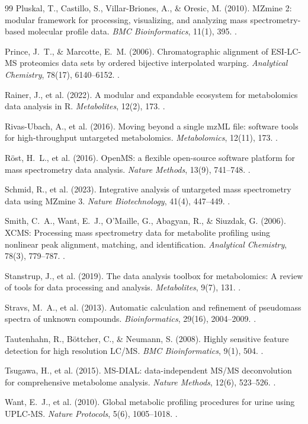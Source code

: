 \documentclass[11pt,twoside,openright]{book}
\begin{document}
\begin{thebibliography}{99}
Pluskal, T., Castillo, S., Villar-Briones, A., \& Oresic, M. (2010). MZmine 2: modular framework for processing, visualizing, and analyzing mass spectrometry-based molecular profile data. \textit{BMC Bioinformatics}, 11(1), 395. .

Prince, J.~T., \& Marcotte, E.~M. (2006). Chromatographic alignment of ESI-LC-MS proteomics data sets by ordered bijective interpolated warping. \textit{Analytical Chemistry}, 78(17), 6140--6152. .

Rainer, J., et al. (2022). A modular and expandable ecosystem for metabolomics data analysis in R. \textit{Metabolites}, 12(2), 173. .

Rivas-Ubach, A., et al. (2016). Moving beyond a single mzML file: software tools for high-throughput untargeted metabolomics. \textit{Metabolomics}, 12(11), 173. .

R\"ost, H.~L., et al. (2016). OpenMS: a flexible open-source software platform for mass spectrometry data analysis. \textit{Nature Methods}, 13(9), 741--748. .

Schmid, R., et al. (2023). Integrative analysis of untargeted mass spectrometry data using MZmine 3. \textit{Nature Biotechnology}, 41(4), 447--449. .

Smith, C.~A., Want, E.~J., O'Maille, G., Abagyan, R., \& Siuzdak, G. (2006). XCMS: Processing mass spectrometry data for metabolite profiling using nonlinear peak alignment, matching, and identification. \textit{Analytical Chemistry}, 78(3), 779--787. .

Stanstrup, J., et al. (2019). The data analysis toolbox for metabolomics: A review of tools for data processing and analysis. \textit{Metabolites}, 9(7), 131. .

Stravs, M.~A., et al. (2013). Automatic calculation and refinement of pseudomass spectra of unknown compounds. \textit{Bioinformatics}, 29(16), 2004--2009. .

Tautenhahn, R., B\"ottcher, C., \& Neumann, S. (2008). Highly sensitive feature detection for high resolution LC/MS. \textit{BMC Bioinformatics}, 9(1), 504. .

Tsugawa, H., et al. (2015). MS-DIAL: data-independent MS/MS deconvolution for comprehensive metabolome analysis. \textit{Nature Methods}, 12(6), 523--526. .

Want, E.~J., et al. (2010). Global metabolic profiling procedures for urine using UPLC-MS. \textit{Nature Protocols}, 5(6), 1005--1018. .

\end{thebibliography}
\end{document}

